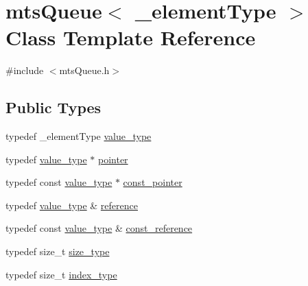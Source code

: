 \hypertarget{classmts_queue}{}\section{mts\+Queue$<$ \+\_\+element\+Type $>$ Class Template Reference}
\label{classmts_queue}


{\ttfamily \#include $<$mts\+Queue.\+h$>$}

\subsection*{Public Types}
\begin{DoxyCompactItemize}
\item 
typedef \+\_\+element\+Type \hyperlink{classmts_queue_a041a2b244150e58247ee55039e0bb00f}{value\+\_\+type}
\item 
typedef \hyperlink{classmts_queue_a041a2b244150e58247ee55039e0bb00f}{value\+\_\+type} $\ast$ \hyperlink{classmts_queue_a66d423ede5c12e015a4e070e1bc23f43}{pointer}
\item 
typedef const \hyperlink{classmts_queue_a041a2b244150e58247ee55039e0bb00f}{value\+\_\+type} $\ast$ \hyperlink{classmts_queue_a1224d9a0146fab27bdb1db050288acb4}{const\+\_\+pointer}
\item 
typedef \hyperlink{classmts_queue_a041a2b244150e58247ee55039e0bb00f}{value\+\_\+type} \& \hyperlink{classmts_queue_ac59cdd255fe34f580085d58030887439}{reference}
\item 
typedef const \hyperlink{classmts_queue_a041a2b244150e58247ee55039e0bb00f}{value\+\_\+type} \& \hyperlink{classmts_queue_a3ae67f8b6cdb9686e5fca9ed1740290e}{const\+\_\+reference}
\item 
typedef size\+\_\+t \hyperlink{classmts_queue_a41b33537b89ae654421ba5e7c9893ed2}{size\+\_\+type}
\item 
typedef size\+\_\+t \hyperlink{classmts_queue_a2ddbc96d89691532f84001deeaa19ffe}{index\+\_\+type}
\end{DoxyCompactItemize}
